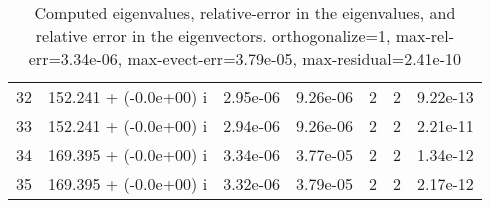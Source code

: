 \begin{table}[H]
\begin{center}
\begin{tabular}{|c|c|c|c|c|c|c|}
    32  &    152.241 + (-0.0e+00) i  &    2.95e-06      &   9.26e-06    &   2    &  2   &    9.22e-13 \\
    33  &    152.241 + (-0.0e+00) i  &    2.94e-06      &   9.26e-06    &   2    &  2   &    2.21e-11 \\
    34  &    169.395 + (-0.0e+00) i  &    3.34e-06      &   3.77e-05    &   2    &  2   &    1.34e-12 \\
    35  &    169.395 + (-0.0e+00) i  &    3.32e-06      &   3.79e-05    &   2    &  2   &    2.17e-12 \\
\hline
\end{tabular}
\caption{Computed eigenvalues, relative-error in the eigenvalues, and relative error in the eigenvectors. orthogonalize=1, max-rel-err=3.34e-06, max-evect-err=3.79e-05, max-residual=2.41e-10
}\label{table:genEigssice8.order4.ng3.hdf}
\end{center}
\end{table}
